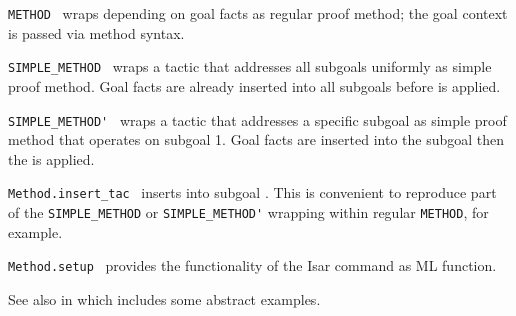 \begin{isabellebody}
\begin{isamarkuptext}
\begin{description}
  \item \verb|METHOD|~ wraps  depending on goal facts as regular proof method; the goal
  context is passed via method syntax.

  \item \verb|SIMPLE_METHOD|~ wraps a tactic that
  addresses all subgoals uniformly as simple proof method.  Goal facts
  are already inserted into all subgoals before  is
  applied.

  \item \verb|SIMPLE_METHOD'|~ wraps a tactic that
  addresses a specific subgoal as simple proof method that operates on
  subgoal 1.  Goal facts are inserted into the subgoal then the  is applied.

  \item \verb|Method.insert_tac|~ inserts  into subgoal .  This is convenient to reproduce
  part of the \verb|SIMPLE_METHOD| or \verb|SIMPLE_METHOD'| wrapping
  within regular \verb|METHOD|, for example.

  \item \verb|Method.setup|~ provides
  the functionality of the Isar command \hyperlink{command.method-setup}{\mbox{}} as ML
  function.

  \end{description}%
\end{isamarkuptext}%
\isamarkuptrue%
%
\endisatagmlref
{\isafoldmlref}%
%
\isadelimmlref
%
\endisadelimmlref
%
\isadelimmlex
%
\endisadelimmlex
%
\isatagmlex
%
\begin{isamarkuptext}%
See also \hyperlink{command.method-setup}{\mbox{}} in
  \cite{isabelle-isar-ref} which includes some abstract examples.


\end{isamarkuptext}
\end{isabellebody}
